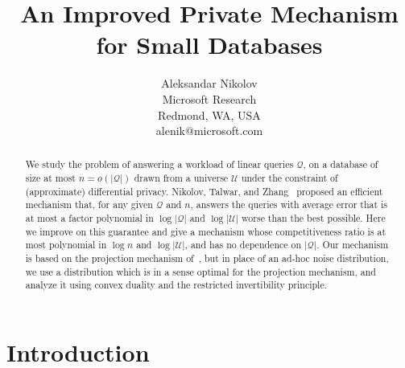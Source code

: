 \documentclass{article}
\newcommand{\univ}{U}
\renewcommand{\univ}{\mathcal{U}}
\newcommand{\quer}{\mathcal{Q}}
\begin{document}
\title{An Improved Private Mechanism for Small Databases}
\author{Aleksandar Nikolov\\{Microsoft Research}\\{ Redmond, WA,
    USA}\\{alenik@microsoft.com}} 
\date{}
\maketitle              
\begin{abstract}
  We study the problem of answering a workload of linear queries
  $\quer$, on a database of size at most $n = o(|\quer|)$ drawn from a
  universe $\univ$ under the constraint of (approximate) differential
  privacy. Nikolov, Talwar, and Zhang~\cite{NTZ} proposed an efficient
  mechanism that, for any given $\quer$ and $n$, answers the queries
  with average error that is at most a factor polynomial in $\log
  |\quer|$ and $\log |\univ|$ worse than the best possible. Here we
  improve on this guarantee and give a mechanism whose competitiveness
  ratio is at most polynomial in $\log n$ and $\log |\univ|$, and has
  no dependence on $|\quer|$. Our mechanism is based on the projection
  mechanism of~\cite{NTZ}, but in place of an ad-hoc noise
  distribution, we use a distribution which is in a sense optimal for
  the projection mechanism, and analyze it using convex duality and
  the restricted invertibility principle.
\end{abstract}

\section{Introduction}
\end{document}
